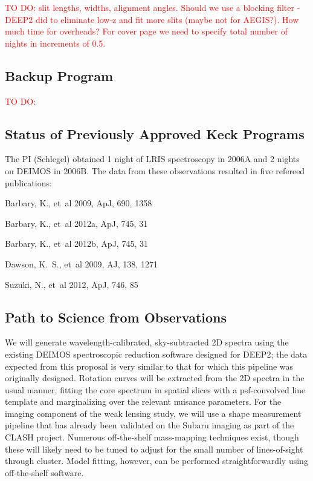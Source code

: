 \documentclass[12pt]{article}
\begin{document}
\textcolor{Red}{TO DO: slit lengths, widths, alignment angles. Should we use a blocking filter - DEEP2 did to eliminate low-z and fit more slits (maybe not for AEGIS?). How much time for overheads? For cover page we need to specify total number of nights in increments of 0.5.}

\subsection{Backup Program}
\textcolor{Red}{TO DO:}

\subsection{Status of Previously Approved Keck Programs}
The PI (Schlegel) obtained 1 night of LRIS spectroscopy in 2006A and 2 nights on DEIMOS in 2006B. The data from these observations resulted in five refereed publications:

{\small
\begin{description}
  \item {Barbary}, K., {et~al} 2009, ApJ, 690, 1358
  \item {Barbary}, K., {et~al} 2012a, ApJ, 745, 31
  \item {Barbary}, K., {et~al} 2012b, ApJ, 745, 31
  \item {Dawson}, K.~S., {et~al} 2009, AJ,  138, 1271
  \item {Suzuki}, N., {et~al} 2012, ApJ, 746, 85
\end{description}
}

\subsection{Path to Science from Observations}
We will generate wavelength-calibrated, sky-subtracted 2D spectra using the existing DEIMOS spectroscopic reduction software designed for DEEP2; the data expected from this proposal is very similar to that for which this pipeline was originally designed. Rotation curves will be extracted from the 2D spectra in the usual manner, fitting the core spectrum in spatial slices with a psf-convolved line template and marginalizing over the relevant nuisance parameters. For the imaging component of the weak lensing study, we will use a shape measurement pipeline that has already been validated on the Subaru imaging as part of the CLASH project. Numerous off-the-shelf mass-mapping techniques exist, though these will likely need to be tuned to adjust for the small number of lines-of-sight through cluster. Model fitting, however, can be performed straightforwardly using off-the-shelf software.
\end{document}
